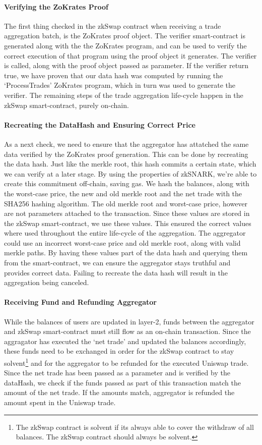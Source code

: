 \documentclass[../../thesis.tex]{subfiles}
\begin{document}
\paragraph{Verifying the ZoKrates Proof}
The first thing checked in the zkSwap contract when receiving a trade aggregation batch, is the ZoKrates proof object. The verifier smart-contract is generated along with the the ZoKrates program, and can be used to verify the correct execution of that program using the proof object it generates. The verifier is called, along with the proof object passed as parameter. If the verifier return true, we have proven that our data hash was computed by running the `ProcessTrades' ZoKrates program, which in turn was used to generate the verifier. The remaining steps of the trade aggregation life-cycle happen in the zkSwap smart-contract, purely on-chain.

\paragraph{Recreating the DataHash and Ensuring Correct Price} \label{trade_checks}
As a next check, we need to ensure that the aggregator has attatched the same data verified by the ZoKrates proof generation. This can be done by recreating the data hash. Just like the merkle root, this hash commits a certain state, which we can verify at a later stage. By using the properties of zkSNARK, we're able to create this commitment off-chain, saving gas. We hash the balances, along with the worst-case price, the new and old merkle root and the net trade with the SHA256 hashing algorithm. The old merkle root and worst-case price, however are not parameters attached to the transaction. Since these values are stored in the zkSwap smart-contract, we use these values. This ensured the correct values where used throughout the entire life-cycle of the aggregation. The aggregator could use an incorrect worst-case price and old merkle root, along with valid merkle paths. By having these values part of the data hash and querying them from the smart-contract, we can ensure the aggregator stays truthful and provides correct data. Failing to recreate the data hash will result in the aggregation being canceled.

\paragraph{Receiving Fund and Refunding Aggregator}
While the balances of users are updated in layer-2, funds between the aggregator and zkSwap smart-contract must still flow as an on-chain transaction. Since the aggragator has executed the `net trade' and updated the balances accordingly, these funds need to be exchanged in order for the zkSwap contract to stay solvent\footnote{The zkSwap contract is solvent if its always able to cover the withdraw of all balances. The zkSwap contract should always be solvent.} and for the aggregator to be refunded for the executed Uniswap trade. Since the net trade has been passed as a parameter and is verified by the dataHash, we check if the funds passed as part of this transaction match the amount of the net trade. If the amounts match, aggregator is refunded the amount spent in the Uniswap trade. 
\end{document}

